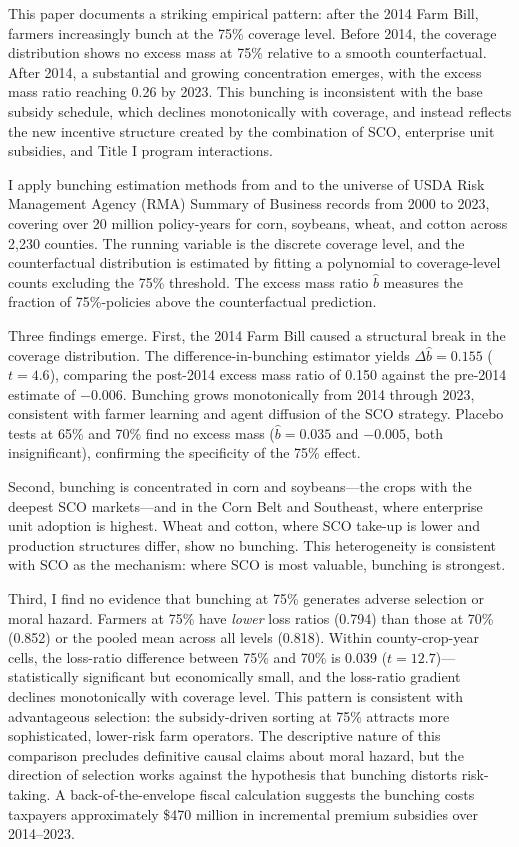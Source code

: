 \documentclass[12pt]{article}
\begin{document}
This paper documents a striking empirical pattern: after the 2014 Farm Bill, farmers increasingly bunch at the 75\% coverage level. Before 2014, the coverage distribution shows no excess mass at 75\% relative to a smooth counterfactual. After 2014, a substantial and growing concentration emerges, with the excess mass ratio reaching 0.26 by 2023. This bunching is inconsistent with the base subsidy schedule, which declines monotonically with coverage, and instead reflects the new incentive structure created by the combination of SCO, enterprise unit subsidies, and Title I program interactions.

I apply bunching estimation methods from \citet{kleven2013} and \citet{saez2010} to the universe of USDA Risk Management Agency (RMA) Summary of Business records from 2000 to 2023, covering over 20 million policy-years for corn, soybeans, wheat, and cotton across 2,230 counties. The running variable is the discrete coverage level, and the counterfactual distribution is estimated by fitting a polynomial to coverage-level counts excluding the 75\% threshold. The excess mass ratio $\hat{b}$ measures the fraction of 75\%-policies above the counterfactual prediction.

Three findings emerge. First, the 2014 Farm Bill caused a structural break in the coverage distribution. The difference-in-bunching estimator yields $\Delta\hat{b} = 0.155$ ($t = 4.6$), comparing the post-2014 excess mass ratio of 0.150 against the pre-2014 estimate of $-0.006$. Bunching grows monotonically from 2014 through 2023, consistent with farmer learning and agent diffusion of the SCO strategy. Placebo tests at 65\% and 70\% find no excess mass ($\hat{b} = 0.035$ and $-0.005$, both insignificant), confirming the specificity of the 75\% effect.

Second, bunching is concentrated in corn and soybeans---the crops with the deepest SCO markets---and in the Corn Belt and Southeast, where enterprise unit adoption is highest. Wheat and cotton, where SCO take-up is lower and production structures differ, show no bunching. This heterogeneity is consistent with SCO as the mechanism: where SCO is most valuable, bunching is strongest.

Third, I find no evidence that bunching at 75\% generates adverse selection or moral hazard. Farmers at 75\% have \textit{lower} loss ratios (0.794) than those at 70\% (0.852) or the pooled mean across all levels (0.818). Within county-crop-year cells, the loss-ratio difference between 75\% and 70\% is 0.039 ($t = 12.7$)---statistically significant but economically small, and the loss-ratio gradient declines monotonically with coverage level. This pattern is consistent with advantageous selection: the subsidy-driven sorting at 75\% attracts more sophisticated, lower-risk farm operators. The descriptive nature of this comparison precludes definitive causal claims about moral hazard, but the direction of selection works against the hypothesis that bunching distorts risk-taking. A back-of-the-envelope fiscal calculation suggests the bunching costs taxpayers approximately \$470 million in incremental premium subsidies over 2014--2023.
\end{document}
